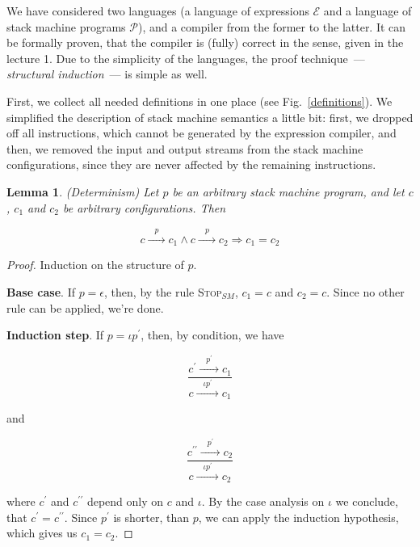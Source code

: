 \documentclass{article}
\def\transarrow{\xrightarrow}
\def\padding{\phantom{X}}
\newcommand{\trule}[2]{\frac{#1}{#2}}
\newcommand{\trans}[3]{{#1}\transarrow{\padding#2\padding}{#3}}
\newcommand{\rulename}[1]{\textsc{#1}}
\newtheorem{lemma}{Lemma}
\theoremstyle{definition}
\begin{document}
We have considered two languages (a language of expressions $\mathscr E$ and a language of stack machine programs $\mathscr P$), and a compiler from the former to the latter.
It can be formally proven, that the compiler is (fully) correct in the sense, given in the lecture 1. Due to the simplicity of the languages, the proof technique~---
\emph{structural induction}~--- is simple as well.

First, we collect all needed definitions in one place (see Fig.~\ref{definitions}). We simplified the description of stack machine semantics a little bit: first,
we dropped off all instructions, which cannot be generated by the expression compiler, and then, we removed the input and output streams from the stack machine
configurations, since they are never affected by the remaining instructions.

\begin{lemma}(Determinism)
  Let $p$ be an arbitrary stack machine program, and let $c$, $c_1$ and $c_2$ be arbitrary configurations. Then

  \[
    \trans{c}{p}{c_1} \wedge \trans{c}{p}{c_2} \Rightarrow c_1= c_2
  \]
\end{lemma}
\begin{proof}
  Induction on the structure of $p$.

  \textbf{Base case}. If $p=\epsilon$, then, by the rule \rulename{Stop$_{SM}$}, $c_1=c$ and $c_2=c$. Since no other rule can be
  applied, we're done.

  \textbf{Induction step}. If $p=\iota p^\prime$, then, by condition, we have

    \[
      \trule{\trans{c^\prime}{p^\prime}{c_1}}{\trans{c}{\iota p^\prime}{c_1}}
    \]

    and

    \[
      \trule{\trans{c^{\prime\prime}}{p^\prime}{c_2}}{\trans{c}{\iota p^\prime}{c_2}}
    \]

    where $c^\prime$ and $c^{\prime\prime}$ depend only on $c$ and $\iota$. By the case analysis on $\iota$ we conclude, that
    $c^\prime=c^{\prime\prime}$. Since $p^\prime$ is shorter, than $p$, we can apply the induction hypothesis, which gives us
    $c_1=c_2$.
\end{proof}

\FloatBarrier
\end{document}
